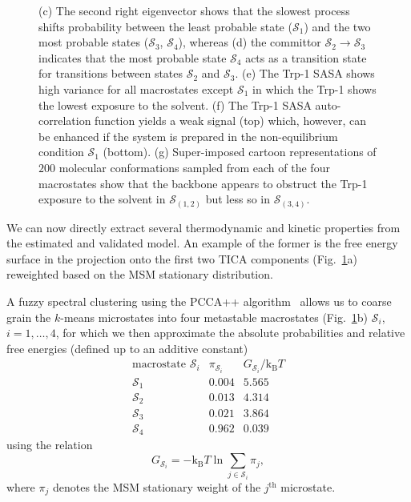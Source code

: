 \documentclass[9pt,tutorial]{livecoms}
\begin{document}
\begin{figure}
{(c) The second right eigenvector shows that the slowest process shifts probability between the least probable state ($\mathcal{S}_1$) and the two most probable states ($\mathcal{S}_3$, $\mathcal{S}_4$), whereas
(d) the committor $\mathcal{S}_2\to\mathcal{S}_3$ indicates that the most probable state $\mathcal{S}_4$ acts as a transition state for transitions between states $\mathcal{S}_2$ and $\mathcal{S}_3$.
(e) The Trp-1 SASA shows high variance for all macrostates except $\mathcal{S}_1$ in which the Trp-1 shows the lowest exposure to the solvent.
(f) The Trp-1 SASA auto-correlation function yields a weak signal (top) which, however, can be enhanced if the system is prepared in the non-equilibrium condition $\mathcal{S}_1$ (bottom).
(g) Super-imposed cartoon representations of $200$ molecular conformations sampled from each of the four macrostates show that the backbone appears to obstruct the Trp-1 exposure to the solvent in $\mathcal{S}_{(1,2)}$ but less so in $\mathcal{S}_{(3,4)}$.}
\label{fig:msm-analysis}
\end{figure}

We can now directly extract several thermodynamic and kinetic properties from the estimated and validated model.
An example of the former is the free energy surface in the projection onto the first two TICA components (Fig.~\ref{fig:msm-analysis}a) reweighted based on the MSM stationary distribution.

A fuzzy spectral clustering using the PCCA++ algorithm~\cite{pcca++} allows us to coarse grain the $k$-means microstates into four metastable macrostates (Fig.~\ref{fig:msm-analysis}b) $\mathcal{S}_i$, $i=1,\dots,4$, for which we then approximate the absolute probabilities and relative free energies (defined up to an additive constant)
\[ \begin{array}{ccc}
\textrm{macrostate } \mathcal{S}_i & \pi_{\mathcal{S}_i} & G_{\mathcal{S}_i} / \textrm{k}_\textrm{B} T \\
\hline
\mathcal{S}_1 & 0.004 & 5.565 \\
\mathcal{S}_2 & 0.013 & 4.314 \\
\mathcal{S}_3 & 0.021 & 3.864 \\
\mathcal{S}_4 & 0.962 & 0.039
\end{array}\]
using the relation
\begin{equation}
\label{eq:fe}
G_{\mathcal{S}_i} = - \textrm{k}_\textrm{B} T \ln \sum\limits_{j\in \mathcal{S}_i} \pi_j,
\end{equation}
where $\pi_j$ denotes the MSM stationary weight of the $j^\textrm{th}$ microstate.
\end{document}
